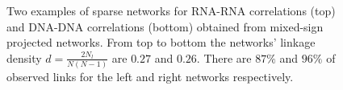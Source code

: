 \documentclass[10pt,a4paper]{article}
\begin{document}
\begin{figure}[h!]
\centering
{}
\caption{\label{fig:mixedsparsenet} Two examples of sparse networks for RNA-RNA correlations (top) and DNA-DNA correlations (bottom) obtained from mixed-sign projected networks. From top to bottom the networks' linkage density $d=\frac{2N_{l}}{N(N-1)}$ are $0.27$ and $0.26$. There are $87\%$ and $96\%$ of observed links for the left and right networks respectively.}
\end{figure}
\end{document}
